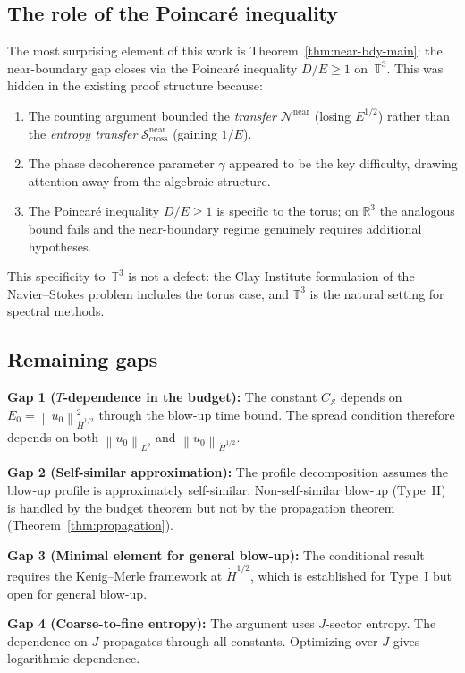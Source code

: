 \documentclass[11pt]{article}
\theoremstyle{definition}
\newcommand{\R}{\mathbb{R}}
\newcommand{\T}{\mathbb{T}}
\newcommand{\norm}[1]{\left\| #1 \right\|}
\newcommand{\Hdot}[1]{\dot{H}^{#1}}
\newcommand{\cS}{\mathcal{S}}
\newcommand{\cN}{\mathcal{N}}
\begin{document}
\subsection{The role of the Poincar\'e inequality}

The most surprising element of this work is
Theorem~\ref{thm:near-bdy-main}: the near-boundary gap
closes via the Poincar\'e inequality $D/E \geq 1$ on~$\T^3$.
This was hidden in the existing proof structure because:
\begin{enumerate}[label=(\alph*)]
\item The counting argument bounded the \emph{transfer}
$\cN^{\mathrm{near}}$ (losing $E^{1/2}$) rather than
the \emph{entropy transfer} $\cS_{\mathrm{cross}}^{\mathrm{near}}$
(gaining $1/E$).
\item The phase decoherence parameter $\gamma$ appeared to
be the key difficulty, drawing attention away from the
algebraic structure.
\item The Poincar\'e inequality $D/E \geq 1$ is specific
to the torus; on $\R^3$ the analogous bound fails and
the near-boundary regime genuinely requires additional
hypotheses.
\end{enumerate}

This specificity to~$\T^3$ is not a defect: the Clay
Institute formulation of the Navier--Stokes problem
includes the torus case, and $\T^3$ is the natural
setting for spectral methods.


\subsection{Remaining gaps}

\textbf{Gap 1 ($T$-dependence in the budget):}
The constant $C_\cS$ depends on $E_0 = \norm{u_0}_{\Hdot{1/2}}^2$
through the blow-up time bound.  The spread condition
therefore depends on both $\norm{u_0}_{L^2}$ and
$\norm{u_0}_{\Hdot{1/2}}$.

\textbf{Gap 2 (Self-similar approximation):}
The profile decomposition assumes the blow-up profile
is approximately self-similar.  Non-self-similar blow-up
(Type~II) is handled by the budget theorem but not by
the propagation theorem (Theorem~\ref{thm:propagation}).

\textbf{Gap 3 (Minimal element for general blow-up):}
The conditional result requires the Kenig--Merle framework
at $\Hdot{1/2}$, which is established for Type~I but open
for general blow-up.

\textbf{Gap 4 (Coarse-to-fine entropy):}
The argument uses $J$-sector entropy.  The dependence on $J$
propagates through all constants.  Optimizing over $J$ gives
logarithmic dependence.
\end{document}
